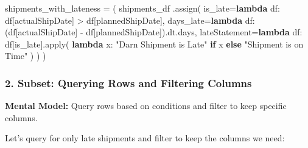 \documentclass[
  letterpaper,
  DIV=11,
  numbers=noendperiod]{scrartcl}
\newenvironment{Shaded}{\begin{snugshade}}{\end{snugshade}}
\newcommand{\BuiltInTok}[1]{\textcolor[rgb]{0.00,0.23,0.31}{#1}}
\newcommand{\ControlFlowTok}[1]{\textcolor[rgb]{0.00,0.23,0.31}{\textbf{#1}}}
\newcommand{\KeywordTok}[1]{\textcolor[rgb]{0.00,0.23,0.31}{\textbf{#1}}}
\newcommand{\NormalTok}[1]{\textcolor[rgb]{0.00,0.23,0.31}{#1}}
\newcommand{\OperatorTok}[1]{\textcolor[rgb]{0.37,0.37,0.37}{#1}}
\newcommand{\StringTok}[1]{\textcolor[rgb]{0.13,0.47,0.30}{#1}}
\begin{document}
\begin{Shaded}
\begin{Highlighting}[]
\NormalTok{shipments\_with\_lateness }\OperatorTok{=}\NormalTok{ (}
\NormalTok{    shipments\_df}
\NormalTok{    .assign(}
\NormalTok{        is\_late}\OperatorTok{=}\KeywordTok{lambda}\NormalTok{ df: df[}\StringTok{\textquotesingle{}actualShipDate\textquotesingle{}}\NormalTok{] }\OperatorTok{\textgreater{}}\NormalTok{ df[}\StringTok{\textquotesingle{}plannedShipDate\textquotesingle{}}\NormalTok{],}
\NormalTok{        days\_late}\OperatorTok{=}\KeywordTok{lambda}\NormalTok{ df: (df[}\StringTok{\textquotesingle{}actualShipDate\textquotesingle{}}\NormalTok{] }\OperatorTok{{-}}\NormalTok{ df[}\StringTok{\textquotesingle{}plannedShipDate\textquotesingle{}}\NormalTok{]).dt.days,}
\NormalTok{        lateStatement}\OperatorTok{=}\KeywordTok{lambda}\NormalTok{ df: df[}\StringTok{\textquotesingle{}is\_late\textquotesingle{}}\NormalTok{].}\BuiltInTok{apply}\NormalTok{(}
            \KeywordTok{lambda}\NormalTok{ x: }\StringTok{"Darn Shipment is Late"} \ControlFlowTok{if}\NormalTok{ x }\ControlFlowTok{else} \StringTok{"Shipment is on Time"}
\NormalTok{        )}
\NormalTok{    )}
\NormalTok{)}
\end{Highlighting}
\end{Shaded}

\subsubsection{2. Subset: Querying Rows and Filtering
Columns}\label{subset-querying-rows-and-filtering-columns}

\textbf{Mental Model:} Query rows based on conditions and filter to keep
specific columns.

Let's query for only late shipments and filter to keep the columns we
need:
\end{document}
